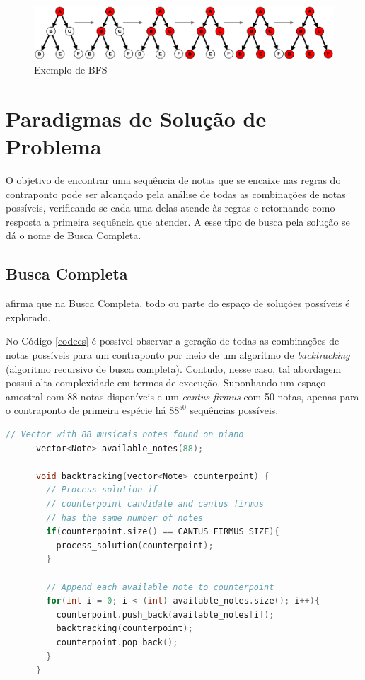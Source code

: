       \begin{figure}[htb]
        \centering
        \includegraphics[scale=0.2]{figuras/bfs.eps}
        \caption{Exemplo de BFS}
        \label{bfs}
      \end{figure}

  \section[Paradigmas de Solução de Problema]{Paradigmas de Solução de Problema}

    O objetivo de encontrar uma sequência de notas que se encaixe nas regras do contraponto pode ser alcançado pela análise de todas as combinações de notas possíveis, verificando se cada uma delas atende às regras e retornando como resposta a primeira sequência que atender. A esse tipo de busca pela solução se dá o nome de Busca Completa.

    \subsection[Busca Completa]{Busca Completa}

       afirma que na Busca Completa, todo ou parte do espaço de soluções possíveis é explorado.

      No Código \ref{codecs} é possível observar a geração de todas as combinações de notas possíveis para um contraponto por meio de um algoritmo de \textit{backtracking} (algoritmo recursivo de busca completa). Contudo, nesse caso, tal abordagem possui alta complexidade em termos de execução. Suponhando um espaço amostral com 88 notas disponíveis e um \textit{cantus firmus} com 50 notas, apenas para o contraponto de primeira espécie há $88^{50}$ sequências possíveis.

      \begin{lstlisting}[language={C}, caption={Busca Completa}, label={codecs}]
      // Vector with 88 musicais notes found on piano
      vector<Note> available_notes(88);

      void backtracking(vector<Note> counterpoint) {
        // Process solution if
        // counterpoint candidate and cantus firmus
        // has the same number of notes
        if(counterpoint.size() == CANTUS_FIRMUS_SIZE){
          process_solution(counterpoint);
        }

        // Append each available note to counterpoint
        for(int i = 0; i < (int) available_notes.size(); i++){
          counterpoint.push_back(available_notes[i]);
          backtracking(counterpoint);
          counterpoint.pop_back();
        }
      }
      \end{lstlisting}

